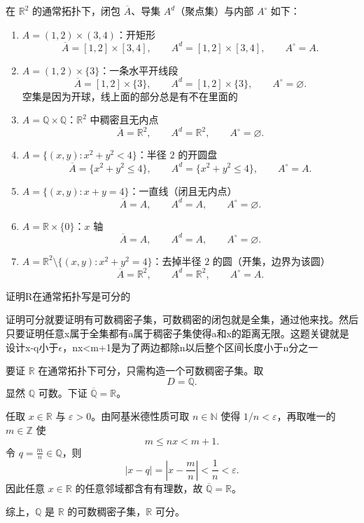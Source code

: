\begin{solution}
在 $\mathbb{R}^2$ 的通常拓扑下，闭包 $\overline{A}$、导集 $A^{d}$（聚点集）与内部 $A^\circ$ 如下：

\begin{enumerate}[(1)]
  \item $A=(1,2)\times(3,4)$：开矩形  
  \[
  \overline{A}=[1,2]\times[3,4],\qquad A^{d}=[1,2]\times[3,4],\qquad A^\circ=A.
  \]

  \item $A=(1,2)\times\{3\}$：一条水平开线段  
  \[
  \overline{A}=[1,2]\times\{3\},\qquad A^{d}=[1,2]\times\{3\},\qquad A^\circ=\varnothing.
  \]空集是因为开球，线上面的部分总是有不在里面的

  \item $A=\mathbb{Q}\times\mathbb{Q}$：$\mathbb{R}^2$ 中稠密且无内点  
  \[
  \overline{A}=\mathbb{R}^2,\qquad A^{d}=\mathbb{R}^2,\qquad A^\circ=\varnothing.
  \]

  \item $A=\{(x,y):x^2+y^2<4\}$：半径 $2$ 的开圆盘  
  \[
  \overline{A}=\{x^2+y^2\le 4\},\qquad A^{d}=\{x^2+y^2\le 4\},\qquad A^\circ=A.
  \]

  \item $A=\{(x,y):x+y=4\}$：一直线（闭且无内点）  
  \[
  \overline{A}=A,\qquad A^{d}=A,\qquad A^\circ=\varnothing.
  \]

  \item $A=\mathbb{R}\times\{0\}$：$x$ 轴  
  \[
  \overline{A}=A,\qquad A^{d}=A,\qquad A^\circ=\varnothing.
  \]

  \item $A=\mathbb{R}^2\setminus\{(x,y):x^2+y^2=4\}$：去掉半径 $2$ 的圆（开集，边界为该圆）  
  \[
  \overline{A}=\mathbb{R}^2,\qquad A^{d}=\mathbb{R}^2,\qquad A^\circ=A.
  \]
\end{enumerate}
\end{solution}
\begin{homework}
[14]证明R在通常拓扑写是可分的
\end{homework}
\begin{dxtips}
    证明可分就要证明有可数稠密子集，可数稠密的闭包就是全集，通过他来找。然后只要证明任意x属于全集都有a属于稠密子集使得a和x的距离无限。这题关键就是设计x-q小于$\epsilon$，nx<m+1是为了两边都除n以后整个区间长度小于n分之一
\end{dxtips}
\begin{solution}
要证 $\mathbb{R}$ 在通常拓扑下可分，只需构造一个可数稠密子集。取
\[
D=\mathbb{Q}.
\]
显然 $\mathbb{Q}$ 可数。下证 $\overline{\mathbb{Q}}=\mathbb{R}$。

任取 $x\in\mathbb{R}$ 与 $\varepsilon>0$。由阿基米德性质可取 $n\in\mathbb{N}$ 使得 $1/n<\varepsilon$，再取唯一的 $m\in\mathbb{Z}$ 使
\[
m \le nx < m+1.
\]
令 $q=\frac{m}{n}\in\mathbb{Q}$，则
\[
|x-q|=\left|x-\frac{m}{n}\right|<\frac{1}{n}<\varepsilon.
\]
因此任意 $x\in\mathbb{R}$ 的任意邻域都含有有理数，故 $\overline{\mathbb{Q}}=\mathbb{R}$。

综上，$\mathbb{Q}$ 是 $\mathbb{R}$ 的可数稠密子集，$\mathbb{R}$ 可分。
\end{solution}
